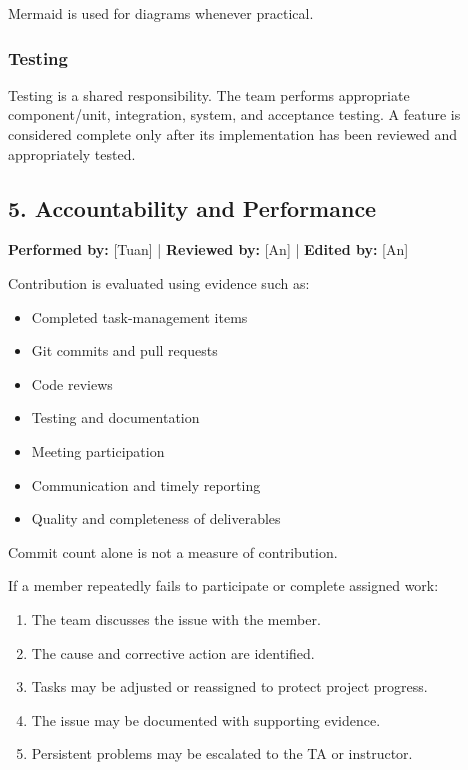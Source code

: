 \documentclass[12pt]{article}
\begin{document}
Mermaid is used for diagrams whenever practical.

\subsubsection{Testing}

Testing is a shared responsibility. The team performs appropriate component/unit, integration, system, and acceptance testing. A feature is considered complete only after its implementation has been reviewed and appropriately tested.

\subsection{5. Accountability and Performance}

\textbf{Performed by:} [Tuan] | \textbf{Reviewed by:} [An] | \textbf{Edited by:} [An]

Contribution is evaluated using evidence such as:

\begin{itemize}
    \item Completed task-management items
    \item Git commits and pull requests
    \item Code reviews
    \item Testing and documentation
    \item Meeting participation
    \item Communication and timely reporting
    \item Quality and completeness of deliverables
\end{itemize}

Commit count alone is not a measure of contribution.

If a member repeatedly fails to participate or complete assigned work:

\begin{enumerate}
    \item The team discusses the issue with the member.
    \item The cause and corrective action are identified.
    \item Tasks may be adjusted or reassigned to protect project progress.
    \item The issue may be documented with supporting evidence.
    \item Persistent problems may be escalated to the TA or instructor.
\end{enumerate}
\end{document}
